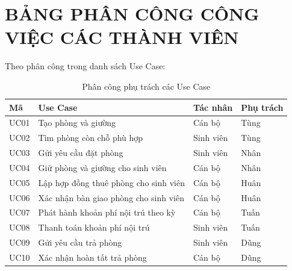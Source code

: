 \clearpage
\chapter*{BẢNG PHÂN CÔNG CÔNG VIỆC CÁC THÀNH VIÊN}
{}

Theo phân công trong danh sách Use Case:

\begin{table}[H]
\centering
\begin{tabularx}{\textwidth}{|>{\raggedright\arraybackslash}p{}|>{\raggedright\arraybackslash}X|>{\raggedright\arraybackslash}p{}|>{\raggedright\arraybackslash}p{}|}
\hline
\textbf{Mã} & \textbf{Use Case} & \textbf{Tác nhân} & \textbf{Phụ trách} \\
\hline
UC01 & Tạo phòng và giường & Cán bộ & Tùng \\
\hline
UC02 & Tìm phòng còn chỗ phù hợp & Sinh viên & Tùng \\
\hline
UC03 & Gửi yêu cầu đặt phòng & Sinh viên & Nhân \\
\hline
UC04 & Giữ phòng và giường cho sinh viên & Cán bộ & Nhân \\
\hline
UC05 & Lập hợp đồng thuê phòng cho sinh viên & Cán bộ & Huân \\
\hline
UC06 & Xác nhận bàn giao phòng cho sinh viên & Cán bộ & Huân \\
\hline
UC07 & Phát hành khoản phí nội trú theo kỳ & Cán bộ & Tuấn \\
\hline
UC08 & Thanh toán khoản phí nội trú & Sinh viên & Tuấn \\
\hline
UC09 & Gửi yêu cầu trả phòng & Sinh viên & Dũng \\
\hline
UC10 & Xác nhận hoàn tất trả phòng & Cán bộ & Dũng \\
\hline
\end{tabularx}
\caption{Phân công phụ trách các Use Case}
\label{tab:work-assignment}
\end{table}
